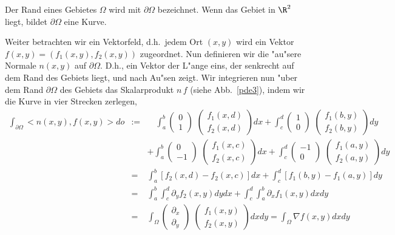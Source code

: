 Der Rand eines Gebietes $\Omega$ wird mit $\partial \Omega$ bezeichnet. Wenn das Gebiet 
in $\R^2$ liegt, bildet $\partial\Omega$ eine Kurve. \par
Weiter betrachten wir ein Vektorfeld, d.h.\ jedem Ort $(x,y)$ wird ein Vektor 
$f(x,y) = (f_1(x,y), f_2(x,y))$ zugeordnet. Nun definieren wir die "au"sere Normale 
$n(x,y)$ auf $\partial\Omega$. D.h., ein Vektor der L"ange eins, der senkrecht 
auf dem Rand des Gebiets liegt, und nach Au"sen zeigt. Wir integrieren nun "uber 
dem Rand $\partial\Omega$ 
des Gebiets das Skalarprodukt $n\, f$ (siehe Abb.~\ref{pde3}), indem wir 
die Kurve in vier Strecken zerlegen,
\begin{eqnarray*}
\int_{\partial\Omega} <n(x,y), f(x,y)> do & :=  &\quad 
\int_a^b \left(\begin{array}{c}0\\1\end{array}\right)\,\, \left(\begin{array}{c}f_1(x,d)\\f_2(x,d)\end{array}\right) dx
+\int_c^d \left(\begin{array}{c}1\\0\end{array}\right)\,\, \left(\begin{array}{c}f_1(b,y)\\f_2(b,y)\end{array}\right) dy\\
&&+\int_a^b \left(\begin{array}{c}0\\-1\end{array}\right)\,\, \left(\begin{array}{c}f_1(x,c)\\f_2(x,c)\end{array}\right) dx
+\int_c^d \left(\begin{array}{c}-1\\0\end{array}\right)\,\, \left(\begin{array}{c}f_1(a,y)\\f_2(a,y)\end{array}\right) dy\\
& = & 
\int_a^b [f_2(x,d)-f_2(x,c)] dx + \int_c^d [f_1(b,y)-f_1(a,y)] dy\\
& = & 
\int_a^b \int_c^d \partial_y f_2(x,y) dy dx + \int_c^d \int_a^b\partial_x f_1(x,y) dx dy\\
&=& \int_\Omega \left(\begin{array}{c}\partial_x\\\partial_y\end{array}\right)\,\, \left(\begin{array}{c}f_1(x,y)\\f_2(x,y)\end{array}\right) dxdy
= \int_\Omega \nabla f(x,y) dx dy
\end{eqnarray*}
